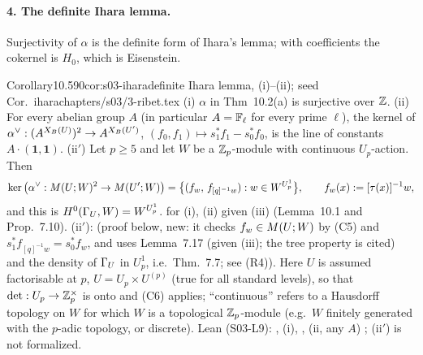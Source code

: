\paragraph{4. The definite Ihara lemma.} Surjectivity of $\alpha$ is the definite form of Ihara's lemma; with coefficients the cokernel is
$H_0$, which is Eisenstein.

\begin{quoted}{Corollary}{10.5}{90}{cor:s03-ihara}{definite Ihara lemma, (i)--(ii); seed Cor.~ihara}{chapters/s03/3-ribet.tex}\label{rpt:cor:s03-ihara}
(i) $\alpha$ in Thm~10.2(a) is surjective over $\mathbb{Z}$.
(ii) For every abelian group $A$ (in particular $A=\mathbb{F}_\ell$ for every prime $\ell$), the kernel of
$\alpha^\vee:(A^{X_B(U)})^2\to A^{X_B(U')}$, $(f_0,f_1)\mapsto s_1^*f_1-s_0^*f_0$, is the line of constants $A\cdot(\mathbf1,\mathbf1)$.
(ii$'$) Let $p\ge5$ and let $W$ be a $\mathbb{Z}_p$-module with continuous $U_p$-action. Then
\[\ker\big(\alpha^\vee:M(U;W)^2\to M(U';W)\big)=\big\{(f_w,\,f_{[q]^{-1}w}):w\in W^{U^1_p}\big\},\qquad f_w(x):=[\tau(x)]^{-1}w,\]
and this is $H^0(\Gamma_U,W)=W^{U^1_p}$.
\stproved{} for (i), (ii) given (iii) (Lemma~10.1 and Prop.~7.10). (ii$'$): \stpmc{} (proof below, new: it checks
$f_w\in M(U;W)$ by (C5) and $s_1^*f_{[q]^{-1}w}=s_0^*f_w$, and uses Lemma~7.17 (given (iii); the tree property is cited)
and the density of $\Gamma_U$ in $U^1_p$, i.e.\ Thm.~7.7; see (R4)). Here $U$ is assumed factorisable at $p$, $U=U_p\times U^{(p)}$ (true
for all standard levels), so that $\det:U_p\to\mathbb{Z}_p^\times$ is onto and (C6) applies; ``continuous'' refers to a Hausdorff topology on $W$ for which
$W$ is a topological $\mathbb{Z}_p$-module (e.g.\ $W$ finitely generated with the $p$-adic topology, or discrete). Lean (S03-L9): ,  (i), ,  (ii, any $A$) \stformal{}; (ii$'$) is not formalized.
\end{quoted}
